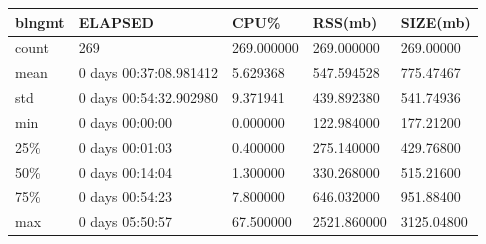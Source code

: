\documentclass{article}
\begin{document}
\begin{tabular}{|l|l|l|l|l|}
\hline 
\hline blngmt& ELAPSED&   CPU\%&  RSS(mb)&   SIZE(mb) \\
\hline count&    269& 269.000000&  269.000000&  269.00000 \\
\hline mean&  0 days 00:37:08.981412&  5.629368&  547.594528&  775.47467 \\
\hline std&  0 days 00:54:32.902980&  9.371941&  439.892380&  541.74936 \\
\hline min&   0 days 00:00:00&  0.000000&  122.984000&  177.21200 \\
\hline 25\%&   0 days 00:01:03&  0.400000&  275.140000&  429.76800 \\
\hline 50\%&   0 days 00:14:04&  1.300000&  330.268000&  515.21600 \\
\hline 75\%&   0 days 00:54:23&  7.800000&  646.032000&  951.88400 \\
\hline max&   0 days 05:50:57&  67.500000& 2521.860000& 3125.04800 \\
\hline 
\end{tabular}
\end{document}
